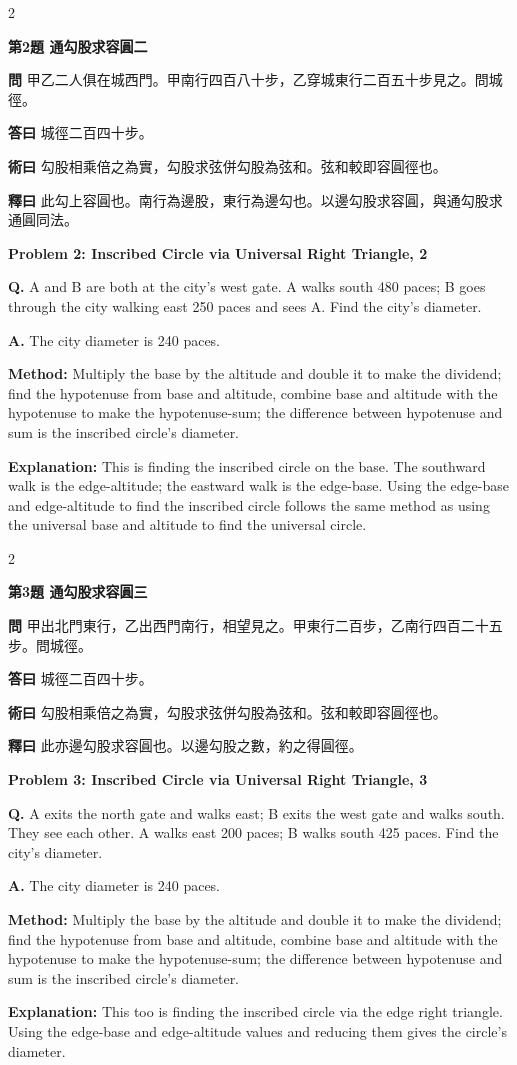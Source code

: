 \documentclass[11pt,a4paper]{article}
\newcommand{\wen}[1]{\noindent\textbf{問} #1\par\smallskip}
\newcommand{\da}[1]{\noindent\textbf{答曰} #1\par\smallskip}
\newcommand{\shu}[1]{\noindent\textbf{術曰} #1\par\smallskip}
\newcommand{\shi}[1]{\noindent\textbf{釋曰} #1\par\smallskip}
\newcommand{\wenE}[1]{\noindent\textbf{Q.} #1\par\smallskip}
\newcommand{\daE}[1]{\noindent\textbf{A.} #1\par\smallskip}
\newcommand{\shuE}[1]{\noindent\textbf{Method:} #1\par\smallskip}
\newcommand{\shiE}[1]{\noindent\textbf{Explanation:} #1\par\smallskip}
\begin{document}
\bigskip

\begin{paracol}{2}

\noindent\textbf{第2題 通勾股求容圓二}

\wen{甲乙二人俱在城西門。甲南行四百八十步，乙穿城東行二百五十步見之。問城徑。}
\da{城徑二百四十步。}
\shu{勾股相乘倍之為實，勾股求弦併勾股為弦和。弦和較即容圓徑也。}
\shi{此勾上容圓也。南行為邊股，東行為邊勾也。以邊勾股求容圓，與通勾股求通圓同法。}

\switchcolumn

\noindent\textbf{Problem 2: Inscribed Circle via Universal Right Triangle, 2}

\wenE{A and B are both at the city's west gate. A walks south 480 paces; B goes through the city walking east 250 paces and sees A. Find the city's diameter.}
\daE{The city diameter is 240 paces.}
\shuE{Multiply the base by the altitude and double it to make the dividend; find the hypotenuse from base and altitude, combine base and altitude with the hypotenuse to make the hypotenuse-sum; the difference between hypotenuse and sum is the inscribed circle's diameter.}
\shiE{This is finding the inscribed circle on the base. The southward walk is the edge-altitude; the eastward walk is the edge-base. Using the edge-base and edge-altitude to find the inscribed circle follows the same method as using the universal base and altitude to find the universal circle.}

\end{paracol}

\bigskip

\begin{paracol}{2}

\noindent\textbf{第3題 通勾股求容圓三}

\wen{甲出北門東行，乙出西門南行，相望見之。甲東行二百步，乙南行四百二十五步。問城徑。}
\da{城徑二百四十步。}
\shu{勾股相乘倍之為實，勾股求弦併勾股為弦和。弦和較即容圓徑也。}
\shi{此亦邊勾股求容圓也。以邊勾股之數，約之得圓徑。}

\switchcolumn

\noindent\textbf{Problem 3: Inscribed Circle via Universal Right Triangle, 3}

\wenE{A exits the north gate and walks east; B exits the west gate and walks south. They see each other. A walks east 200 paces; B walks south 425 paces. Find the city's diameter.}
\daE{The city diameter is 240 paces.}
\shuE{Multiply the base by the altitude and double it to make the dividend; find the hypotenuse from base and altitude, combine base and altitude with the hypotenuse to make the hypotenuse-sum; the difference between hypotenuse and sum is the inscribed circle's diameter.}
\shiE{This too is finding the inscribed circle via the edge right triangle. Using the edge-base and edge-altitude values and reducing them gives the circle's diameter.}

\end{paracol}
\end{document}

